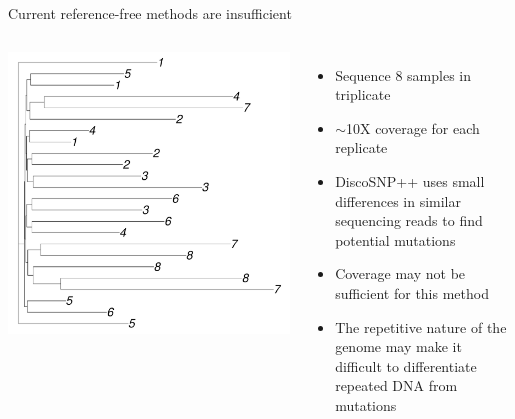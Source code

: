 \documentclass[table]{beamer}
\begin{document}
\begin{frame}{Current reference-free methods are insufficient}
\begin{columns}
		\includegraphics[width=\linewidth]{01-first-11-scaffolds.pdf}
	\begin{itemize}
		\item Sequence 8 samples in triplicate
		\item $\sim$10X coverage for each replicate
		\item DiscoSNP++ uses small differences in similar sequencing reads to find potential mutations
		\item Coverage may not be sufficient for this method
		\item The repetitive nature of the genome may make it difficult to differentiate repeated DNA from mutations
	\end{itemize}
\end{columns}
\end{frame}
\end{document}
